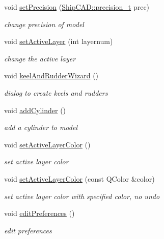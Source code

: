 \begin{DoxyCompactItemize}
void \hyperlink{classShipCAD_1_1Controller_a013b57fb59e7326e944100073d7da410}{set\+Precision} (\hyperlink{namespaceShipCAD_ae13c7e36dfb1e2300741a631041cd915}{Ship\+C\+A\+D\+::precision\+\_\+t} prec)
\begin{DoxyCompactList}\small\item\em change precision of model \end{DoxyCompactList}\item 
void \hyperlink{classShipCAD_1_1Controller_a385d6d0d743bd8b66fb29bf210f24e6f}{set\+Active\+Layer} (int layernum)
\begin{DoxyCompactList}\small\item\em change the active layer \end{DoxyCompactList}\item 
void \hyperlink{classShipCAD_1_1Controller_acaba200143a2ae5e7ea8d423633bcdf5}{keel\+And\+Rudder\+Wizard} ()
\begin{DoxyCompactList}\small\item\em dialog to create keels and rudders \end{DoxyCompactList}\item 
void \hyperlink{classShipCAD_1_1Controller_a8d257c1c04ae4e6780e91ad53ba767d8}{add\+Cylinder} ()
\begin{DoxyCompactList}\small\item\em add a cylinder to model \end{DoxyCompactList}\item 
void \hyperlink{classShipCAD_1_1Controller_aa471985ce00a517249c2b476db9d4ac6}{set\+Active\+Layer\+Color} ()
\begin{DoxyCompactList}\small\item\em set active layer color \end{DoxyCompactList}\item 
void \hyperlink{classShipCAD_1_1Controller_a53841f9ea28ab735c07d92dc05add50f}{set\+Active\+Layer\+Color} (const Q\+Color \&color)
\begin{DoxyCompactList}\small\item\em set active layer color with specified color, no undo \end{DoxyCompactList}\item 
void \hyperlink{classShipCAD_1_1Controller_aa401aa8ce5117101d34501743af9496f}{edit\+Preferences} ()
\begin{DoxyCompactList}\small\item\em edit preferences \end{DoxyCompactList}\item 

\end{DoxyCompactItemize}
